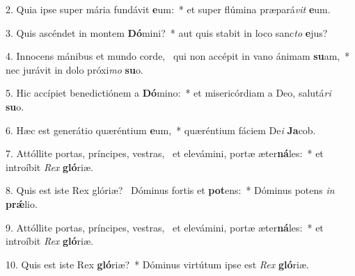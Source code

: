 2. Quia ipse super mária fundávit \textbf{e}um:~*  et super flúmina præpará\textit{vit} \textbf{e}um.\

3. Quis ascéndet in montem \textbf{Dó}mini?~*  aut quis stabit in loco sanc\textit{to} \textbf{e}jus?\

4. Innocens mánibus et mundo corde, \dag\  qui non accépit in vano ánimam \textbf{su}am,~*  nec jurávit in dolo próxi\textit{mo} \textbf{su}o.\

5. Hic accípiet benedictiónem a \textbf{Dó}mino:~*  et misericórdiam a Deo, salutá\textit{ri} \textbf{su}o.\

6. Hæc est generátio quæréntium \textbf{e}um,~*  quæréntium fáciem De\textit{i} \textbf{Ja}cob.\

7. Attóllite portas, príncipes, vestras, \dag\  et elevámini, portæ æter\textbf{ná}les:~*  et introíbit \textit{Rex} \textbf{gló}riæ.\

8. Quis est iste Rex glóriæ? \dag\  Dóminus fortis et \textbf{pot}ens:~*  Dóminus potens \textit{in} \textbf{prǽ}lio.\

9. Attóllite portas, príncipes, vestras, \dag\  et elevámini, portæ æter\textbf{ná}les:~*  et introíbit \textit{Rex} \textbf{gló}riæ.\

10. Quis est iste Rex \textbf{gló}riæ?~*  Dóminus virtútum ipse est \textit{Rex} \textbf{gló}riæ.\

